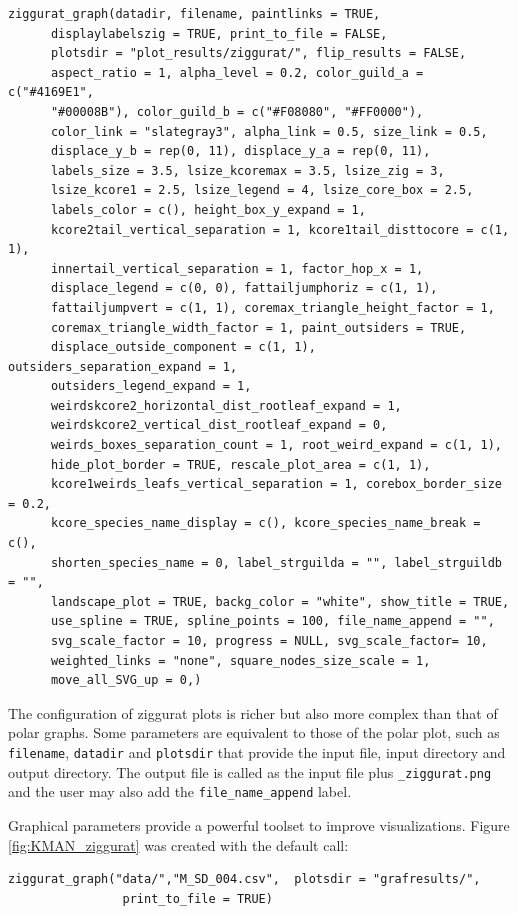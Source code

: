 \documentclass[12pt]{article}
\begin{document}
\fontsize{3.5mm}{3.5mm}\selectfont
\begin{verbatim}
ziggurat_graph(datadir, filename, paintlinks = TRUE,
	  displaylabelszig = TRUE, print_to_file = FALSE,
	  plotsdir = "plot_results/ziggurat/", flip_results = FALSE,
	  aspect_ratio = 1, alpha_level = 0.2, color_guild_a = c("#4169E1",
	  "#00008B"), color_guild_b = c("#F08080", "#FF0000"),
	  color_link = "slategray3", alpha_link = 0.5, size_link = 0.5,
	  displace_y_b = rep(0, 11), displace_y_a = rep(0, 11), 
	  labels_size = 3.5, lsize_kcoremax = 3.5, lsize_zig = 3, 
	  lsize_kcore1 = 2.5, lsize_legend = 4, lsize_core_box = 2.5, 
	  labels_color = c(), height_box_y_expand = 1, 
	  kcore2tail_vertical_separation = 1, kcore1tail_disttocore = c(1, 1), 
	  innertail_vertical_separation = 1, factor_hop_x = 1,
	  displace_legend = c(0, 0), fattailjumphoriz = c(1, 1),
	  fattailjumpvert = c(1, 1), coremax_triangle_height_factor = 1,
	  coremax_triangle_width_factor = 1, paint_outsiders = TRUE,
	  displace_outside_component = c(1, 1), outsiders_separation_expand = 1,
	  outsiders_legend_expand = 1,
	  weirdskcore2_horizontal_dist_rootleaf_expand = 1,
	  weirdskcore2_vertical_dist_rootleaf_expand = 0,
	  weirds_boxes_separation_count = 1, root_weird_expand = c(1, 1),
	  hide_plot_border = TRUE, rescale_plot_area = c(1, 1),
	  kcore1weirds_leafs_vertical_separation = 1, corebox_border_size = 0.2,
	  kcore_species_name_display = c(), kcore_species_name_break = c(),
	  shorten_species_name = 0, label_strguilda = "", label_strguildb = "",
	  landscape_plot = TRUE, backg_color = "white", show_title = TRUE,
	  use_spline = TRUE, spline_points = 100, file_name_append = "",
	  svg_scale_factor = 10, progress = NULL, svg_scale_factor= 10, 
	  weighted_links = "none", square_nodes_size_scale = 1, 
	  move_all_SVG_up = 0,)
\end{verbatim}
\normalsize

The configuration of ziggurat plots is richer but also more complex than that of polar graphs. Some parameters
are equivalent to those of the polar plot, such as \texttt{filename}, \texttt{datadir} and \texttt{plotsdir} that
provide the input file, input directory and output directory. The output file is called as the input file
plus \texttt{\_ziggurat.png} and the user may also add the \texttt{file\_name\_append} label.

Graphical parameters provide a powerful toolset to improve visualizations. Figure \ref{fig:KMAN_ziggurat} was created with the
default call:

\fontsize{3.5mm}{3.5mm}\selectfont
\begin{verbatim}
ziggurat_graph("data/","M_SD_004.csv",  plotsdir = "grafresults/", 
                print_to_file = TRUE)
\end{verbatim}
\normalsize
\end{document}
